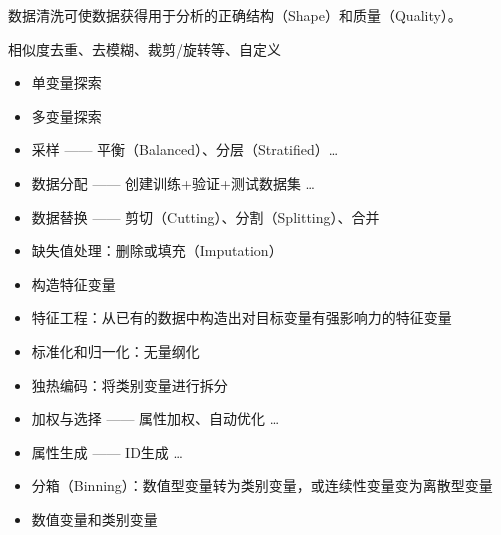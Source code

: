 \documentclass[letterpaper,11pt,english]{sphinxmanual}
\begin{document}
数据清洗可使数据获得用于分析的正确结构（Shape）和质量（Quality）。

相似度去重、去模糊、裁剪/旋转等、自定义
\begin{itemize}
\item {} 
单变量探索

\item {} 
多变量探索

\item {} 
采样 —— 平衡（Balanced）、分层（Stratified）…

\item {} 
数据分配 —— 创建训练+验证+测试数据集 …

\item {} 
数据替换 —— 剪切（Cutting）、分割（Splitting）、合并

\item {} 
缺失值处理：删除或填充（Imputation）

\item {} 
构造特征变量

\item {} 
特征工程：从已有的数据中构造出对目标变量有强影响力的特征变量

\item {} 
标准化和归一化：无量纲化

\item {} 
独热编码：将类别变量进行拆分

\item {} 
加权与选择 —— 属性加权、自动优化 …

\item {} 
属性生成 —— ID生成
…%
\begin{footnote}[320]\sphinxAtStartFootnote
{}
%
\end{footnote}

\item {} 
分箱（Binning）：数值型变量转为类别变量，或连续性变量变为离散型变量

\item {} 
数值变量和类别变量
%
\begin{footnote}[321]\sphinxAtStartFootnote
{}
%
\end{footnote}

\end{itemize}
\end{document}
